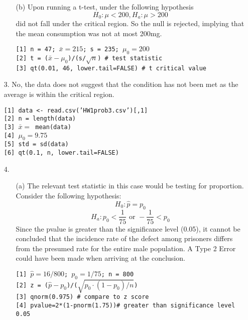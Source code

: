 \documentclass[12pt]{article}
\begin{document}
\begin{enumerate}
\begin{enumerate}
			\item[(b)] Upon running a t-test, under the following hypothesis $$H_0: \mu<200, H_a: \mu > 200$$
				did not fall under the critical region. So the null is rejected, implying that the mean consumption 
				was not at most 200mg.
				 \begin{tcolorbox}[colback=white, title=Work, coltitle=white]
					 \texttt{[1] n = 47; $\bar{x} = 215$; s = 235; $\mu_0 = 200$ }\\
					 \texttt{[2] t = ($\bar{x} - \mu_0$)/(s/$\sqrt{n}$) \# test statistic}\\
					 \texttt{[3] qt(0.01, 46, lower.tail=FALSE) \# t critical value}\\
				 \end{tcolorbox}
		\end{enumerate}
	\item[3.] No, the data does not suggest that the condition has not 
		been met as the average is within the critical region.

				 \begin{tcolorbox}[colback=white, title=Work, coltitle=white]
					 \texttt{[1] data <- read.csv('HW1prob3.csv')[,1]}\\
					 \texttt{[2] n = length(data)}\\
					 \texttt{[3] $\bar{x} = $ mean(data)}\\
					 \texttt{[4] $\mu_0 = 9.75$ }\\
					 \texttt{[5] std = sd(data) }\\
					 \texttt{[6] qt(0.1, n, lower.tail=FALSE)}
				 \end{tcolorbox}
	\item[4.]
		\begin{enumerate}
			\item[(a)] The relevant test statistic in this case would be testing for proportion. 
				Consider the following hypothesis: $$H_0: \hat{p}=p_0 $$
				$$H_a: p_0 < \frac{1}{75} \text{ or } -\frac{1}{75} < p_0$$
				 Since the pvalue is greater than the significance level (0.05), it cannot be 
				 concluded that the incidence rate of the defect among prisoners differs from 
				 the presumed rate for the entire male population. A Type 2 Error could have been made when arriving at the conclusion.

		\begin{tcolorbox}[colback=white, title=Work, coltitle=white]
			\texttt{[1] $\hat{p}=16/800$; $p_0 = 1/75$; n = 800}\\
			\texttt{[2] z = ($\hat{p} - p_0$)/($\sqrt{p_0\cdot(1-p_0)/n}$)}\\
			\texttt{[3] qnorm(0.975) \# compare to z score}\\
			\texttt{[4] pvalue=2*(1-pnorm(1.75))\# greater than significance level 0.05}\\ 
		\end{tcolorbox}


\end{enumerate}
\end{enumerate}
\end{document}
